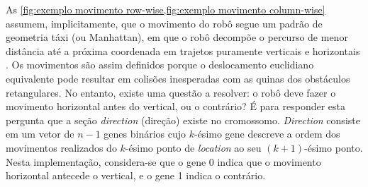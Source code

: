 As \cref{fig:exemplo movimento row-wise,fig:exemplo movimento column-wise} assumem, implicitamente, que o movimento do robô segue um padrão de geometria táxi (ou Manhattan), em que o robô decompõe o percurso de menor distância até a próxima coordenada em trajetos puramente verticais e horizontais \cite{CESAR2010}. Os movimentos são assim definidos porque o deslocamento euclidiano equivalente pode resultar em colisões inesperadas com as quinas dos obstáculos retangulares. No entanto, existe uma questão a resolver: o robô deve fazer o movimento horizontal antes do vertical, ou o contrário? É para responder esta pergunta que a seção \emph{direction} (direção) existe no cromossomo. \emph{Direction} consiste em um vetor de $n - 1$ genes binários cujo $k$-ésimo gene descreve a ordem dos movimentos realizados do $k$-ésimo ponto de \emph{location} ao seu $(k+1)$-ésimo ponto. Nesta implementação, considera-se que o gene 0 indica que o movimento horizontal antecede o vertical, e o gene 1 indica o contrário.